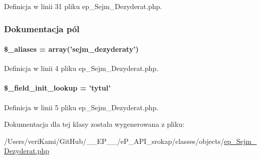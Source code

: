 Definicja w linii 31 pliku ep\-\_\-\-Sejm\-\_\-\-Dezyderat.\-php.



\subsubsection{Dokumentacja pól}
\hypertarget{classep___sejm___dezyderat_ab4e31d75f0bc5d512456911e5d01366b}{
\paragraph[{\$\-\_\-aliases}]{\setlength{\rightskip}{0pt plus 5cm}\$\-\_\-aliases = array('sejm\-\_\-dezyderaty')}}\label{classep___sejm___dezyderat_ab4e31d75f0bc5d512456911e5d01366b}


Definicja w linii 4 pliku ep\-\_\-\-Sejm\-\_\-\-Dezyderat.\-php.

\hypertarget{classep___sejm___dezyderat_a4a4d54ae35428077a7c61ec8a5139af3}{
\paragraph[{\$\-\_\-field\-\_\-init\-\_\-lookup}]{\setlength{\rightskip}{0pt plus 5cm}\$\-\_\-field\-\_\-init\-\_\-lookup = 'tytul'}}\label{classep___sejm___dezyderat_a4a4d54ae35428077a7c61ec8a5139af3}


Definicja w linii 5 pliku ep\-\_\-\-Sejm\-\_\-\-Dezyderat.\-php.



Dokumentacja dla tej klasy została wygenerowana z pliku\-:\begin{DoxyCompactItemize}
\item 
/\-Users/veri\-Kami/\-Git\-Hub/\-\_\-\-\_\-\-E\-P\-\_\-\-\_\-/e\-P\-\_\-\-A\-P\-I\-\_\-srokap/classes/objects/\hyperlink{ep___sejm___dezyderat_8php}{ep\-\_\-\-Sejm\-\_\-\-Dezyderat.\-php}\end{DoxyCompactItemize}
